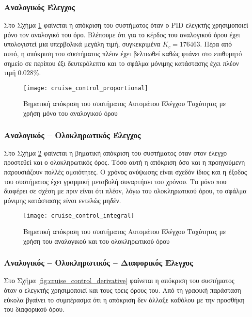 \subsubsection{Αναλογικός Έλεγχος}

Στο Σχήμα \ref{fig:cruise_control_proportional} φαίνεται η απόκριση του συστήματος όταν ο PID ελεγκτής χρησιμοποιεί μόνο τον αναλογικό του όρο. Βλέπουμε ότι για το κέρδος του αναλογικού όρου έχει υπολογιστεί μια υπερβολικά μεγάλη τιμή, συγκεκριμένα $K_c = 176463$. Πέρα από αυτό, η απόκριση του συστήματος πλέον έχει βελτιωθεί καθώς φτάνει στο επιθυμητό σημείο σε περίπου έξι δευτερόλεπτα και το σφάλμα μόνιμης κατάστασης έχει πλέον τιμή $0.028\%$.

\begin{figure}[h]
  \centering
  \texttt{[image: cruise\_control\_proportional]}
  \caption{Βηματική απόκριση του συστήματος Αυτομάτου Ελέγχου Ταχύτητας με χρήση μόνο του αναλογικού όρου}
  \label{fig:cruise_control_proportional}
\end{figure}

\subsubsection{Αναλογικός  --  Ολοκληρωτικός Έλεγχος}

Στο Σχήμα \ref{fig:cruise_control_integral} φαίνεται η βηματική απόκριση του συστήματος όταν στον έλεγχο προστεθεί και ο ολοκληρωτικός όρος. Τόσο αυτή η απόκριση όσο και η προηγούμενη παρουσιάζουν πολλές ομοιότητες. Ο χρόνος ανύψωσης είναι σχεδόν ίδιος και η έξοδος του συστήματος έχει γραμμική μεταβολή συναρτήσει του χρόνου. Το μόνο που διαφέρει σε σχέση με πριν είναι ότι πλέον, λόγω του ολοκληρωτικού όρου, το σφάλμα μόνιμης κατάστασης είναι εντελώς μηδέν.

\begin{figure}[h]
  \centering
  \texttt{[image: cruise\_control\_integral]}
  \caption{Βηματική απόκριση του συστήματος Αυτομάτου Ελέγχου Ταχύτητας με χρήση του αναλογικού και του ολοκληρωτικού όρου}
  \label{fig:cruise_control_integral}
\end{figure}

\subsubsection{Αναλογικός  --  Ολοκληρωτικός  --  Διαφορικός Έλεγχος}

Στο Σχήμα \ref{fig:cruise_control_derivative} φαίνεται η απόκριση του συστήματος όταν ο ελεγκτής χρησιμοποιεί και τους τρεις όρους του. Από τη γραφική παράσταση εύκολα βγαίνει το συμπέρασμα ότι η απόκριση δεν άλλαξε καθόλου με την προσθήκη του διαφορικού όρου.

